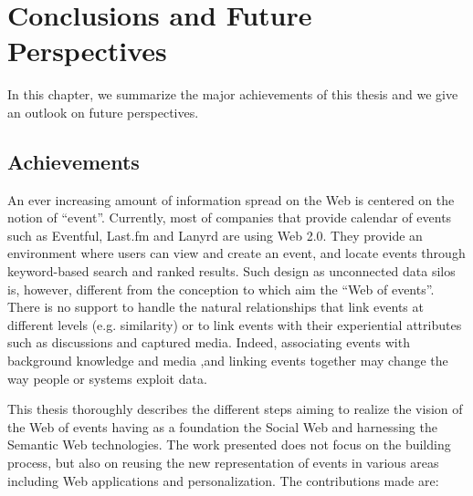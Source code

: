 \chapter{Conclusions and Future Perspectives}  \label{ch:conclusion}

In this chapter, we summarize the major achievements of this thesis and we give an outlook on future perspectives.

\section{Achievements}

An ever increasing amount of information spread on the Web is centered on the notion of ``event''. Currently, most of companies that provide calendar of events such as Eventful, Last.fm and Lanyrd are using Web 2.0. They provide an environment where users can view and create an event, and locate events through keyword-based search and ranked results. Such design as unconnected data silos is, however, different from the conception to which aim the ``Web of events''. There is no support to handle the natural relationships that link events at different levels (e.g. similarity) or to link events with their experiential attributes such as discussions and captured media. Indeed, associating events with background knowledge and media ,and linking events together may change the way people or systems exploit data.

This thesis thoroughly describes the different steps aiming to realize the vision of the Web of events having as a foundation the Social Web and harnessing the Semantic Web technologies. The work presented does not focus on the building process, but also on reusing the new representation of events in various areas including Web applications and personalization. The contributions made are:

